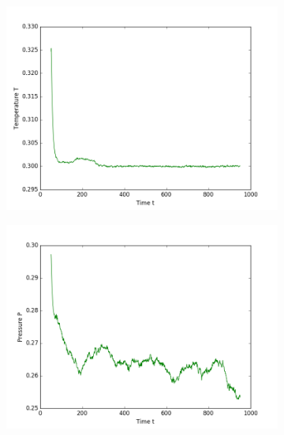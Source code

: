 \begin{figure}[ht]
\begin{subfigure}{0.3\textwidth}
\includegraphics[width=\textwidth]{fig/avTemperature_T0d3_M100.png}
\end{subfigure}
\hfill
\begin{subfigure}{0.3\textwidth}
\includegraphics[width=\textwidth]{fig/avPressure_T0d3_M100.png}
\end{subfigure}
\hfill
\begin{subfigure}{0.3\textwidth}

\end{subfigure}
\end{figure}

